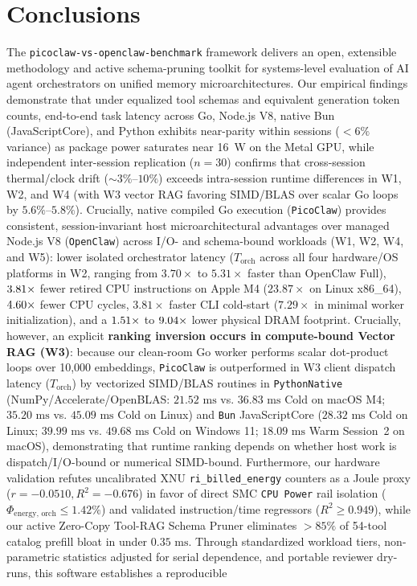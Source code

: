 \documentclass[preprint,12pt,3p]{elsarticle}
\begin{document}



\section{Conclusions}
\label{sec:conclusions}
The \texttt{picoclaw-vs-openclaw-benchmark} framework delivers an open, extensible methodology and active schema-pruning toolkit for systems-level evaluation of AI agent orchestrators on unified memory microarchitectures. Our empirical findings demonstrate that under equalized tool schemas and equivalent generation token counts, end-to-end task latency across Go, Node.js V8, native Bun (JavaScriptCore), and Python exhibits near-parity within sessions ($< 6\%$ variance) as package power saturates near 16~W on the Metal GPU, while independent inter-session replication ($n=30$) confirms that cross-session thermal/clock drift ($\sim 3\%\text{--}10\%$) exceeds intra-session runtime differences in W1, W2, and W4 (with W3 vector RAG favoring SIMD/BLAS over scalar Go loops by $5.6\%\text{--}5.8\%$). Crucially, native compiled Go execution (\texttt{PicoClaw}) provides consistent, session-invariant host microarchitectural advantages over managed Node.js V8 (\texttt{OpenClaw}) across I/O- and schema-bound workloads (W1, W2, W4, and W5): lower isolated orchestrator latency ($T_{\text{orch}}$ across all four hardware/OS platforms in W2, ranging from $3.70\times$ to $5.31\times$ faster than OpenClaw Full), $3.81\times$ fewer retired CPU instructions on Apple M4 ($23.87\times$ on Linux x86\_64), $4.60\times$ fewer CPU cycles, $3.81\times$ faster CLI cold-start ($7.29\times$ in minimal worker initialization), and a $1.51\times$ to $9.04\times$ lower physical DRAM footprint. Crucially, however, an explicit \textbf{ranking inversion occurs in compute-bound Vector RAG (W3)}: because our clean-room Go worker performs scalar dot-product loops over 10,000 embeddings, \texttt{PicoClaw} is outperformed in W3 client dispatch latency ($T_{\text{orch}}$) by vectorized SIMD/BLAS routines in \texttt{PythonNative} (NumPy/Accelerate/OpenBLAS: $21.52\text{ ms}$ vs. $36.83\text{ ms}$ Cold on macOS M4; $35.20\text{ ms}$ vs. $45.09\text{ ms}$ Cold on Linux) and \texttt{Bun} JavaScriptCore ($28.32\text{ ms}$ Cold on Linux; $39.99\text{ ms}$ vs. $49.68\text{ ms}$ Cold on Windows 11; $18.09\text{ ms}$ Warm Session~2 on macOS), demonstrating that runtime ranking depends on whether host work is dispatch/I/O-bound or numerical SIMD-bound. Furthermore, our hardware validation refutes uncalibrated XNU \texttt{ri\_billed\_energy} counters as a Joule proxy ($r = -0.0510, R^2 = -0.676$) in favor of direct SMC \texttt{CPU Power} rail isolation ($\Phi_{\text{energy, orch}} \le 1.42\%$) and validated instruction/time regressors ($R^2 \ge 0.949$), while our active Zero-Copy Tool-RAG Schema Pruner eliminates $>85\%$ of 54-tool catalog prefill bloat in under $0.35\text{ ms}$. Through standardized workload tiers, non-parametric statistics adjusted for serial dependence, and portable reviewer dry-runs, this software establishes a reproducible 
\end{document}
